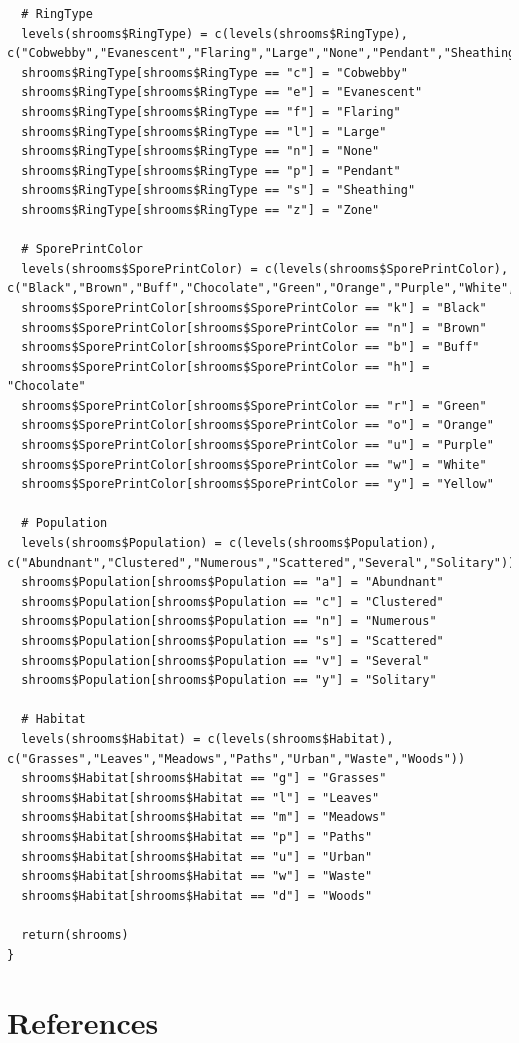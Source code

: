 \documentclass[10pt  ,usenames, dvipsnames]{article}\usepackage[]{graphicx}\usepackage[]{color}
\begin{document}
\begin{lstlisting}
  # RingType
  levels(shrooms$RingType) = c(levels(shrooms$RingType), c("Cobwebby","Evanescent","Flaring","Large","None","Pendant","Sheathing","Zone"))
  shrooms$RingType[shrooms$RingType == "c"] = "Cobwebby"
  shrooms$RingType[shrooms$RingType == "e"] = "Evanescent"
  shrooms$RingType[shrooms$RingType == "f"] = "Flaring"
  shrooms$RingType[shrooms$RingType == "l"] = "Large"
  shrooms$RingType[shrooms$RingType == "n"] = "None"
  shrooms$RingType[shrooms$RingType == "p"] = "Pendant"
  shrooms$RingType[shrooms$RingType == "s"] = "Sheathing"
  shrooms$RingType[shrooms$RingType == "z"] = "Zone"
  
  # SporePrintColor
  levels(shrooms$SporePrintColor) = c(levels(shrooms$SporePrintColor), c("Black","Brown","Buff","Chocolate","Green","Orange","Purple","White","Yellow"))
  shrooms$SporePrintColor[shrooms$SporePrintColor == "k"] = "Black"
  shrooms$SporePrintColor[shrooms$SporePrintColor == "n"] = "Brown"
  shrooms$SporePrintColor[shrooms$SporePrintColor == "b"] = "Buff"
  shrooms$SporePrintColor[shrooms$SporePrintColor == "h"] = "Chocolate"
  shrooms$SporePrintColor[shrooms$SporePrintColor == "r"] = "Green"
  shrooms$SporePrintColor[shrooms$SporePrintColor == "o"] = "Orange"
  shrooms$SporePrintColor[shrooms$SporePrintColor == "u"] = "Purple"
  shrooms$SporePrintColor[shrooms$SporePrintColor == "w"] = "White"
  shrooms$SporePrintColor[shrooms$SporePrintColor == "y"] = "Yellow"
  
  # Population
  levels(shrooms$Population) = c(levels(shrooms$Population), c("Abundnant","Clustered","Numerous","Scattered","Several","Solitary"))
  shrooms$Population[shrooms$Population == "a"] = "Abundnant"
  shrooms$Population[shrooms$Population == "c"] = "Clustered"
  shrooms$Population[shrooms$Population == "n"] = "Numerous"
  shrooms$Population[shrooms$Population == "s"] = "Scattered"
  shrooms$Population[shrooms$Population == "v"] = "Several"
  shrooms$Population[shrooms$Population == "y"] = "Solitary"
  
  # Habitat
  levels(shrooms$Habitat) = c(levels(shrooms$Habitat), c("Grasses","Leaves","Meadows","Paths","Urban","Waste","Woods"))
  shrooms$Habitat[shrooms$Habitat == "g"] = "Grasses"
  shrooms$Habitat[shrooms$Habitat == "l"] = "Leaves"
  shrooms$Habitat[shrooms$Habitat == "m"] = "Meadows"
  shrooms$Habitat[shrooms$Habitat == "p"] = "Paths"
  shrooms$Habitat[shrooms$Habitat == "u"] = "Urban"
  shrooms$Habitat[shrooms$Habitat == "w"] = "Waste"
  shrooms$Habitat[shrooms$Habitat == "d"] = "Woods"
  
  return(shrooms)
}

\end{lstlisting}





\clearpage

\section{References}\label{pubs}

\printbibliography[heading =none]


\clearpage
\end{document}
